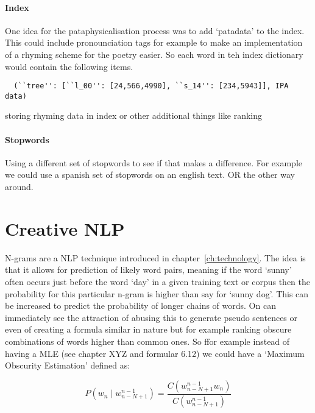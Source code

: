 \paragraph{Index}
One idea for the pataphysicalisation process was to add `patadata' to the index. This could include pronounciation tags for example to make an implementation of a rhyming scheme for the poetry easier. So each word in teh index dictionary would contain the following items.

\begin{verbatim}
  (``tree'': [``l_00'': [24,566,4990], ``s_14'': [234,5943]], IPA data)
\end{verbatim}

storing rhyming data in index or other additional things like ranking

\paragraph{Stopwords}
Using a different set of stopwords to see if that makes a difference. For example we could use a spanish set of stopwords on an english text. OR the other way around.


\section{Creative NLP}
N-grams are a \ac{NLP} technique introduced in chapter~\ref{ch:technology}. The idea is that it allows for prediction of likely word pairs, meaning if the word `sunny' often occurs just before the word `day' in a given training text or corpus then the probability for this particular n-gram is higher than say for `sunny dog'. This can be increased to predict the probability of longer chains of words. On can immediately see the attraction of abusing this to generate pseudo sentences or even of creating a formula similar in nature but for example ranking obscure combinations of words higher than common ones. So ffor example instead of having a \ac{MLE} (see chapter XYZ and formular 6.12) we could have a `Maximum Obscurity Estimation' defined as:

\begin{equation}
  P(w_n \mid w_{n-N+1}^{n-1}) = \frac{C(w_{n-N+1}^{n-1} w_n)}{C(w_{n-N+1}^{n-1})}
  \label{eq:probmoe}
\end{equation}

